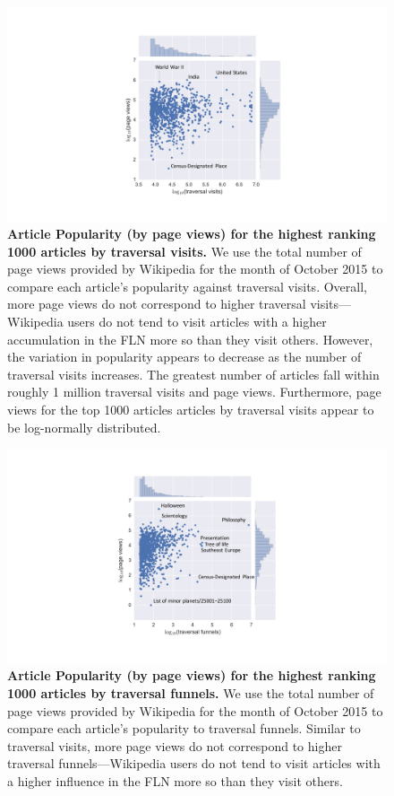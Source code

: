 \documentclass[pre,twocolumn,twoside,superscriptaddress,floatfix]{revtex4-1}
\begin{document}
{\begin{figure}[tp!]
  \includegraphics[width=\columnwidth]{fig013_popularity_visits.pdf}
  \caption{
\textbf{Article Popularity (by page views) for the highest ranking 1000 articles by traversal visits.}
We use the total number of page views provided by Wikipedia for the month
of October 2015 to compare each article's popularity against traversal visits.
Overall, more page views do not correspond to higher traversal visits---Wikipedia users do not tend to visit articles with a higher accumulation in the FLN more so than they visit others. 
However, the variation in popularity appears to decrease as the number of traversal visits increases. The greatest number of articles fall within roughly 1 million traversal visits and page views. Furthermore, page views for the top 1000 articles articles by traversal visits appear to be log-normally distributed. 
}
  \label{fig:Views and Visits}

\end{figure}
\begin{figure}[tp!]
  \includegraphics[width=\columnwidth]{fig014_popularity_funnels.pdf}
  \caption{
\textbf{Article Popularity (by page views) for the highest ranking 1000 articles by traversal funnels.}
We use the total number of page views provided by Wikipedia for the month
of October 2015 to compare each article's popularity to traversal funnels.
Similar to traversal visits, more page views do not correspond to higher traversal funnels---Wikipedia users do not tend to visit articles with a higher influence in the FLN more so than they visit others.
}
  \label{fig:Views and Funnels}
\end{figure}

}
\end{document}
